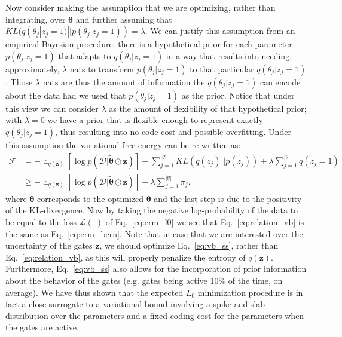 \documentclass{article} %
\DeclareMathOperator{\E}{\mathbb{E}}
\def\!#1{\boldsymbol{#1}}
\def\*#1{\mathbf{#1}}
\begin{document}
Now consider making the assumption that we are optimizing, rather than integrating, over $\!\theta$ and further assuming that $KL(q(\theta_j|z_j=1) || p(\theta_j|z_j=1)) = \lambda$. We can justify this assumption from an empirical Bayesian procedure: there is a hypothetical prior for each parameter $p(\theta_j|z_j=1)$ that adapts to $q(\theta_j|z_j = 1)$ in a way that results into needing, approximately, $\lambda$ nats to transform $p(\theta_j|z_j = 1)$ to that particular $q(\theta_j|z_j = 1)$. Those $\lambda$ nats are thus the amount of information the $q(\theta_j|z_j = 1)$ can encode about the data had we used that $p(\theta_j|z_j = 1)$ as the prior. Notice that under this view we can consider $\lambda$ as the amount of flexibility of that hypothetical prior; with $\lambda = 0$ we have a prior that is flexible enough to represent exactly $q(\theta_j|z_j = 1)$, thus resulting into no code cost and possible overfitting. 
Under this assumption the variational free energy can be re-written as:
\begin{align}
	\mathcal{F} & = - \E_{q(\*z)}[\log p(\mathcal{D}|\tilde{\!\theta}\odot\*z)] + \sum_{j=1}^{|\theta|}KL(q(z_j) || p(z_j)) + \lambda \sum_{j=1}^{|\theta|} q(z_j = 1)\label{eq:vb_ss}\\
	& \geq - \E_{q(\*z)}[\log p(\mathcal{D}|\tilde{\!\theta}\odot\*z)] + \lambda \sum_{j=1}^{|\theta|} \pi_j\label{eq:relation_vb},
\end{align}
where $\tilde{\!\theta}$ corresponds to the optimized $\!\theta$ and the last step is due to the positivity of the KL-divergence. Now by taking the negative log-probability of the data to be equal to the loss $\mathcal{L}(\cdot)$ of Eq.~\ref{eq:erm_l0} we see that Eq.~\ref{eq:relation_vb} is the same as Eq.~\ref{eq:erm_bern}. Note that in case that we are interested over the uncertainty of the gates $\*z$, we should optimize Eq.~\ref{eq:vb_ss}, rather than Eq.~\ref{eq:relation_vb}, as this will properly penalize the entropy of $q(\*z)$. Furthermore, Eq.~\ref{eq:vb_ss} also allows for the incorporation of prior information about the behavior of the gates (e.g. gates being active 10\% of the time, on average). We have thus shown that the expected $L_0$ minimization procedure is in fact a close surrogate to a variational bound involving a spike and slab distribution over the parameters and a fixed coding cost for the parameters when the gates are active.
\end{document}
